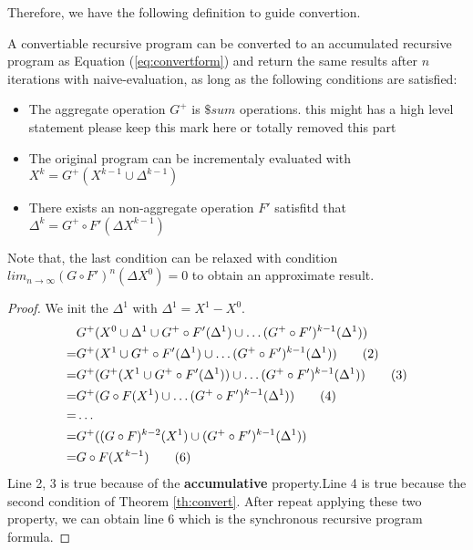 Therefore, we have the following definition to guide convertion.
\begin{definition}
	\label{th:convert}
	A convertiable recursive program can be converted to an accumulated recursive program as Equation (\ref{eq:convertform}) and return the same results after $n$ iterations with naive-evaluation, as long as the following conditions are satisfied:
	\begin{itemize}
		\item The aggregate operation $G^+$ is $\$sum$ operations.{\color{blue} this  might has a high level statement please keep this mark here or totally removed this part}
		
		\item The original program can be incrementaly evaluated with $X^{k}=G^+(X^{k-1}\cup \Delta^{k-1})$
		\item There exists an non-aggregate operation $F'$ satisfitd that $\Delta^{k}=G^+\circ F'(\Delta X^{k-1})$
		
		
	\end{itemize}
\end{definition}
{\color{green}
	Note that, the last condition can be relaxed with condition $lim_{n\rightarrow\infty}(G\circ F')^n(\Delta X^0)=0$ to obtain an approximate result.
}
\begin{proof}
	We init the $\Delta^1$ with $\Delta^1=X^1-X^0$.
	\begin{align}
	&G^+(X^0\cup \Delta^1 \cup G^+\circ F'(\Delta^1)\cup \ldots (G^+ \circ F')^{k-1}(\Delta^1 )) \notag\\
	=&G^+(X^1 \cup G^+\circ F'(\Delta^1  )\cup \ldots (G^+ \circ F')^{k-1}(\Delta^1  )) \tag{2}\\
	=&G^+(G^+(X^1\cup G^+\circ F'(\Delta^1  ))\cup \ldots (G^+ \circ F')^{k-1}(\Delta^1 )) \tag{3}\\
	=&G^+(G\circ F(X^1)\cup \ldots (G^+ \circ F')^{k-1}(\Delta^1 )) \tag{4}\\
	=&\ldots \notag\\
	=&G^+((G\circ F)^{k-2}(X^1)\cup(G^+ \circ F')^{k-1}(\Delta^1 )) \notag\\
	=&G\circ F(X^{k-1})\tag{6}
	\end{align}
	Line 2, 3 is true because of the \textbf{accumulative} property.Line 4 is true because the second condition of Theorem \ref{th:convert}. After repeat applying these two property, we can obtain line 6 which is the synchronous recursive program formula. 
\end{proof}

